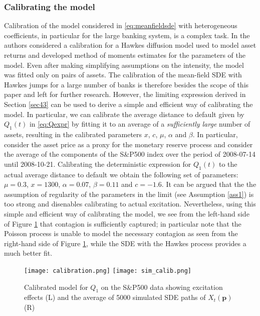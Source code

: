 \documentclass[10pt]{article}
\theoremstyle{plain}
\theoremstyle{definition}
\newcommand{\<}{\langle}
\renewcommand{\>}{\rangle}
\renewcommand{\(}{\left(}
\renewcommand{\)}{\right)}
\renewcommand{\[}{\left[}
\renewcommand{\]}{\right]}
\begin{document}
\subsubsection{Calibrating the model}
Calibration of the model considered in \eqref{eq:meanfieldsde} with heterogeneous coefficients, in particular for the large banking system, is a complex task. In \citet{ait15} the authors considered a calibration for a Hawkes diffusion model used to model asset returns and developed method of moments estimates for the parameters of the model. Even after making simplifying assumptions on the intensity, the model was fitted only on pairs of assets. The calibration of the mean-field SDE with Hawkes jumps for a large number of banks is therefore besides the scope of this paper and left for further research. However, the limiting expression derived in Section \ref{sec43} can be used to derive a simple and efficient way of calibrating the model. In particular, we can calibrate the average distance to default given by $Q_1(t)$ in \eqref{eq:Qexpr} by fitting it to an average of a \emph{sufficiently large} number of assets, resulting in the calibrated parameters $x$, $c$, $\mu$, $\alpha$ and $\beta$. In particular, consider the asset price as a proxy for the monetary reserve process and consider the average of the components of the S\&P500 index over the period of 2008-07-14 until 2008-10-21. Calibrating the deterministic expression for $Q_1(t)$ to the actual average distance to default we obtain the following set of parameters: $\mu = 0.3$, $x = 1300$, $\alpha = 0.07$, $\beta = 0.11$ and $c=-1.6$. It can be argued that the the assumption of regularity of the parameters in the limit (see Assumption \ref{ass1}) is too strong and disenables calibrating to actual excitation. Nevertheless, using this simple and efficient way of calibrating the model, we see from the left-hand side of Figure \ref{figcalib} that contagion is sufficiently captured; in particular note that the Poisson process is unable to model the necessary contagion as seen from the right-hand side of Figure \ref{figcalib}, while the SDE with the Hawkes process provides a much better fit. 

\begin{figure}[H]
\begin{center}
   \caption{Calibrated model for $Q_1$ on the S\&P500 data showing excitation effects (L) and the average of 5000 simulated SDE paths of $X_t(\textbf{p})$ (R)}
\texttt{[image: calibration.png]}
\texttt{[image: sim\_calib.png]}
\label{figcalib}
\end{center}
\end{figure}
\end{document}
